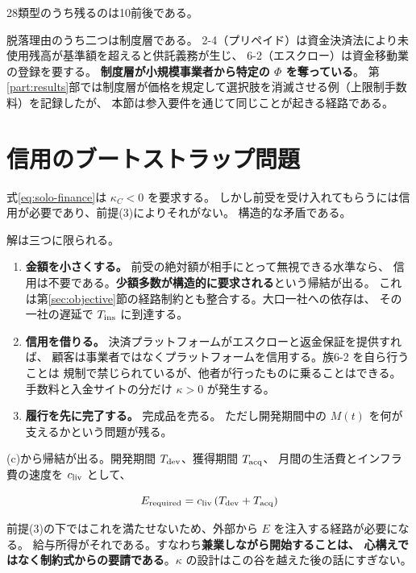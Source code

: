 28類型のうち残るのは10前後である。

\begin{remark}[制度層による剥奪]
脱落理由のうち二つは制度層である。
2-4（プリペイド）は資金決済法により未使用残高が基準額を超えると供託義務が生じ、
6-2（エスクロー）は資金移動業の登録を要する。
\textbf{制度層が小規模事業者から特定の $\Phi$ を奪っている}。
第\ref{part:results}部では制度層が価格を規定して選択肢を消滅させる例（上限制手数料）を記録したが、
本節は参入要件を通じて同じことが起きる経路である。
\end{remark}

\section{信用のブートストラップ問題}
\label{sec:bootstrap}

式\eqref{eq:solo-finance}は $\kappa_C<0$ を要求する。
しかし前受を受け入れてもらうには信用が必要であり、前提(3)によりそれがない。
構造的な矛盾である。

解は三つに限られる。

\begin{enumerate}[label=(\alph*)]
\item \textbf{金額を小さくする。} 前受の絶対額が相手にとって無視できる水準なら、
信用は不要である。\textbf{少額多数が構造的に要求される}という帰結が出る。
これは第\ref{sec:objective}節の経路制約とも整合する。大口一社への依存は、
その一社の遅延で $T_{\mathrm{ins}}$ に到達する。

\item \textbf{信用を借りる。} 決済プラットフォームがエスクローと返金保証を提供すれば、
顧客は事業者ではなくプラットフォームを信用する。族6-2 を自ら行うことは
規制で禁じられているが、他者が行ったものに乗ることはできる。
手数料と入金サイトの分だけ $\kappa>0$ が発生する。

\item \textbf{履行を先に完了する。} 完成品を売る。
ただし開発期間中の $M(t)$ を何が支えるかという問題が残る。
\end{enumerate}

(c)から帰結が出る。開発期間 $T_{\rm dev}$、獲得期間 $T_{\rm acq}$、
月間の生活費とインフラ費の速度を $c_{\rm liv}$ として、

\begin{equation}
E_{\rm required} = c_{\rm liv}\,(T_{\rm dev} + T_{\rm acq})
\label{eq:E-required}
\end{equation}

前提(3)の下ではこれを満たせないため、外部から $E$ を注入する経路が必要になる。
給与所得がそれである。すなわち\textbf{兼業しながら開始することは、
心構えではなく制約式からの要請である}。$\kappa$ の設計はこの谷を越えた後の話にすぎない。

